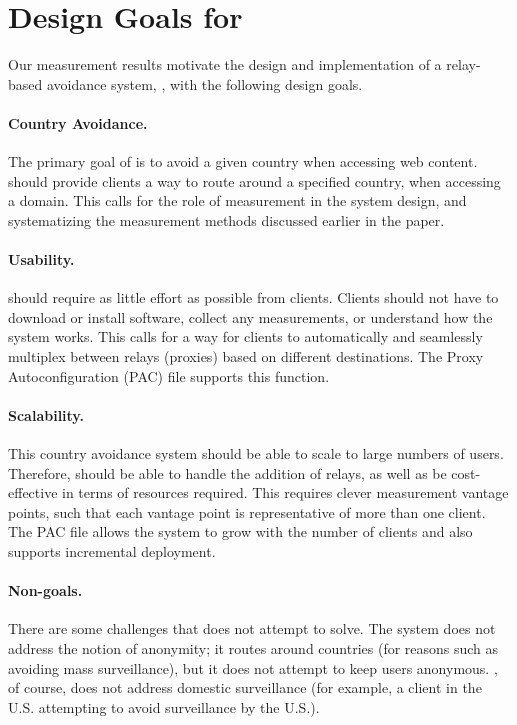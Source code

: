 \section{Design Goals for \system{}}
\label{goals}

Our measurement results motivate 
 the design and implementation of a relay-based avoidance system,
\system{}, with the following design goals.

\paragraph{Country Avoidance.}  The primary goal of \system{} is to
avoid a given country when accessing web content.  \system{} should
provide clients a way to route around a specified country, when
accessing a domain.  This calls for the role of measurement in the
system design, and systematizing the measurement methods discussed
earlier in the paper.

\paragraph{Usability.} \system{} should require as little effort as
possible from clients.  Clients should not have to download
or install software, collect any measurements, or understand how the
system works.  This calls for a way for clients to automatically and
seamlessly multiplex between relays (proxies) based on different
destinations.  The Proxy Autoconfiguration (PAC) file supports this
function.

\paragraph{Scalability.}  This country avoidance system should be able to scale to 
large numbers of users.  Therefore, \system{} should be able to handle the addition
 of relays, as well as be cost-effective in terms of resources required. This requires 
clever measurement vantage points, such that each vantage point is representative of 
more than one client.  The PAC file allows the system to 
grow with the number of clients and also supports incremental deployment.

\paragraph{Non-goals.}  There are some challenges that \system{} does not attempt to 
solve.  The system does not address the notion of anonymity; it routes around 
countries (for reasons such as avoiding mass surveillance), but it does not 
attempt to keep users anonymous.  
\system{}, of course, does not address domestic surveillance (for 
example, a client in the U.S. attempting to avoid surveillance by the 
U.S.).

